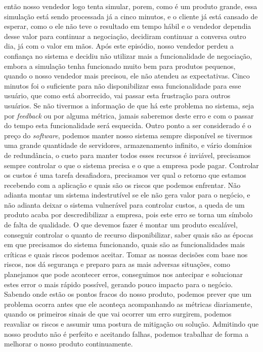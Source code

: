     então nosso vendedor logo tenta simular, porem, como é um produto grande, essa
    simulação está sendo processada já a cinco minutos, e o cliente já está cansado
    de esperar, como o ele não teve o resultado em tempo hábil e o vendedor dependia
    desse valor para continuar a negociação, decidiram continuar a conversa outro dia,
    já com o valor em mãos. Após este episódio, nosso vendedor perdeu a confiança
    no sistema e decidiu não utilizar mais a funcionalidade de negociação, embora a
    simulação tenha funcionado muito bem para produtos pequenos, quando o nosso
    vendedor mais precisou, ele não atendeu as expectativas. Cinco minutos foi o
    suficiente para não disponibilizar essa funcionalidade para esse usuário, que
    como está aborrecido, vai passar esta frustração para outros usuários. Se não
    tivermos a informação de que há este problema no sistema, seja por \textit{feedback}
    ou por alguma métrica, jamais saberemos deste erro e com o passar do tempo esta
    funcionalidade será esquecida. \newline
    Outro ponto a ser considerado é o preço do \textit{software}, podemos manter
    nosso sistema sempre disponível se tivermos uma grande quantidade de servidores,
    armazenamento infinito, e vário domínios de redundância, o custo para manter
    todos esses recursos é inviável, precisamos sempre controlar o que o sistema
    precisa e o que a empresa pode pagar. Controlar os custos é uma tarefa desafiadora,
    precisamos ver qual o retorno que estamos recebendo com a aplicação e quais
    são os riscos que podemos enfrentar. Não adianta montar um sistema indestrutível
    se ele não gera valor para o negócio, e não adianta deixar o sistema vulnerável
    para controlar custos, a queda de um produto acaba por descredibilizar a empresa,
    pois este erro se torna um símbolo de falta de qualidade. O que devemos fazer
    é montar um produto escalável, conseguir controlar o quanto de recurso disponibilizar,
    saber quais são as épocas em que precisamos do sistema funcionando, quais são
    as funcionalidades mais críticas e quais riscos podemos aceitar. Tomar as
    nossas decisões com base nos riscos, nos dá segurança e preparo para as mais
    adversas situações, como planejamos que pode acontecer erros, conseguimos nos
    antecipar e solucionar estes error o mais rápido possível, gerando pouco impacto
    para o negócio. Sabendo onde estão os pontos fracos do nosso produto, podemos
    prever que um problema ocorra antes que ele aconteça acompanhando as métricas
    diariamente, quando os primeiros sinais de que vai ocorrer um erro surgirem,
    podemos reavaliar os riscos e assumir uma postura de mitigação ou solução.
    Admitindo que nosso produto não é perfeito e aceitando falhas, podemos trabalhar
    de forma a melhorar o nosso produto continuamente.

